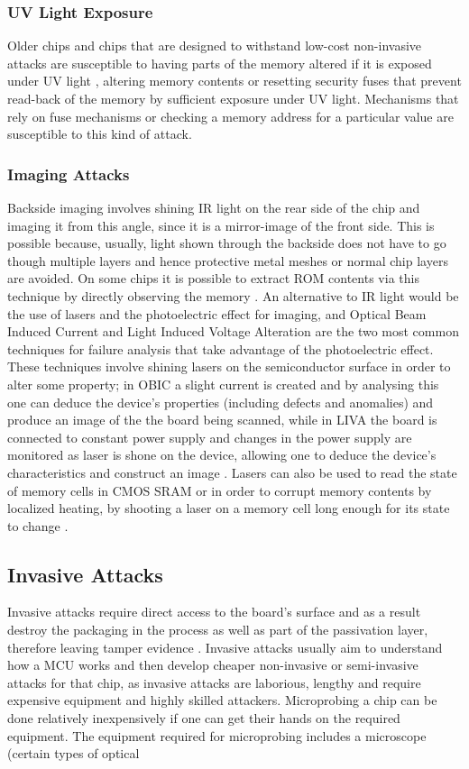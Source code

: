 	\subsubsection{UV Light Exposure}
	Older chips and chips that are designed to withstand low-cost non-invasive attacks are susceptible to having parts of the memory altered if it is exposed under UV light \citep{sergei:thesis}, altering memory contents or resetting security fuses that prevent read-back of the memory by sufficient exposure under UV light. Mechanisms that rely on fuse mechanisms or checking a memory address for a particular value are susceptible to this kind of attack.

	\subsubsection{Imaging Attacks}
	Backside imaging involves shining IR light on the rear side of the chip and imaging it from this angle, since it is a mirror-image of the front side. This is possible because, usually, light shown through the backside does not have to go though multiple layers and hence protective metal meshes or normal chip layers are avoided. On some chips it is possible to extract ROM contents via this technique by directly observing the memory \citep{sergei:thesis}. An alternative to IR light would be the use of lasers and the photoelectric effect for imaging, and Optical Beam Induced Current and Light Induced Voltage Alteration are the two most common techniques for failure analysis that take advantage of the photoelectric effect. These techniques involve shining lasers on the semiconductor surface in order to alter some property; in OBIC a slight current is created and by analysing this one can deduce the device's properties (including defects and anomalies) and produce an image of the the board being scanned, while in LIVA the board is connected to constant power supply and changes in the power supply are monitored as laser is shone on the device, allowing one to deduce the device's characteristics and construct an image \citep{cole:OBIC}. Lasers can also be used to read the state of memory cells in CMOS SRAM \citep{sergei:thesis} or in order to corrupt memory contents by localized heating, by shooting a laser on a memory cell long enough for its state to change \citep{website:riscure} \citep{sergei:thesis}.
	
	\subsection{Invasive Attacks}
	Invasive attacks require direct access to the board's surface and as a result destroy the packaging in the process as well as part of the passivation layer, therefore leaving tamper evidence\citep{sergei:thesis} \citep{hwre}. Invasive attacks usually aim to understand how a MCU works and then develop cheaper non-invasive or semi-invasive attacks for that chip, as invasive attacks are laborious, lengthy and require expensive equipment and highly skilled attackers\citep{sergei:thesis}. Microprobing a chip can be done relatively inexpensively if one can get their hands on the required equipment. The equipment required for microprobing includes a microscope (certain types of optical 
	
